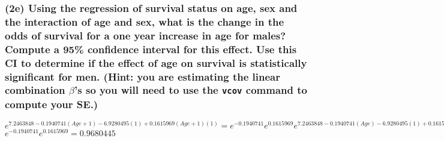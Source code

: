 \documentclass[
]{article}
\begin{document}
\hypertarget{e-using-the-regression-of-survival-status-on-age-sex-and-the-interaction-of-age-and-sex-what-is-the-change-in-the-odds-of-survival-for-a-one-year-increase-in-age-for-males-compute-a-95-confidence-interval-for-this-effect.-use-this-ci-to-determine-if-the-effect-of-age-on-survival-is-statistically-significant-for-men.-hint-you-are-estimating-the-linear-combination-betas-so-you-will-need-to-use-the-vcov-command-to-compute-your-se.}{%
\subsubsection{\texorpdfstring{(2e) Using the regression of survival
status on age, sex and the interaction of age and sex, what is the
change in the odds of survival for a one year increase in age for males?
Compute a 95\% confidence interval for this effect. Use this CI to
determine if the effect of age on survival is statistically significant
for men. (Hint: you are estimating the linear combination \(\beta\)'s so
you will need to use the \texttt{vcov} command to compute your
SE.)}{(2e) Using the regression of survival status on age, sex and the interaction of age and sex, what is the change in the odds of survival for a one year increase in age for males? Compute a 95\% confidence interval for this effect. Use this CI to determine if the effect of age on survival is statistically significant for men. (Hint: you are estimating the linear combination \textbackslash beta's so you will need to use the vcov command to compute your SE.)}}\label{e-using-the-regression-of-survival-status-on-age-sex-and-the-interaction-of-age-and-sex-what-is-the-change-in-the-odds-of-survival-for-a-one-year-increase-in-age-for-males-compute-a-95-confidence-interval-for-this-effect.-use-this-ci-to-determine-if-the-effect-of-age-on-survival-is-statistically-significant-for-men.-hint-you-are-estimating-the-linear-combination-betas-so-you-will-need-to-use-the-vcov-command-to-compute-your-se.}}

\(e^{7.2463848 - 0.1940741(Age + 1) - 6.9280495(1) + 0.1615969(Age + 1)(1)} = e^{-0.1940741}e^{0.1615969}e^{7.2463848 - 0.1940741(Age) - 6.9280495(1) + 0.1615969(Age)(1)}\)
\newline \(e^{-0.1940741}e^{0.1615969} = 0.9680445\)\\
\end{document}
